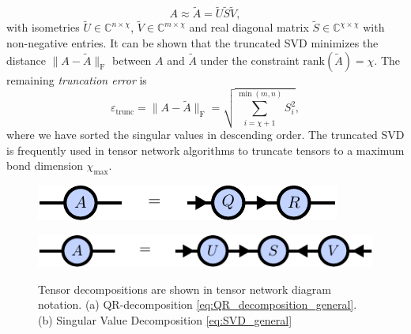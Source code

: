 \begin{equation}
	\label{eq:truncated_SVD_general}
	A \approx \tilde{A} = \tilde{U}\tilde{S}\tilde{V},
\end{equation}
with isometries $\tilde{U}\in\mathbb{C}^{n\times\chi}$, $\tilde{V}\in\mathbb{C}^{m\times\chi}$ and real diagonal matrix $\tilde{S}\in\mathbb{C}^{\chi\times\chi}$ with non-negative entries. It can be shown \cite{cite:eckart_young_theorem} that the truncated SVD minimizes the distance $\lVert A - \tilde{A} \rVert_\text{F}$ between $A$ and $\tilde{A}$ under the constraint $\text{rank}(\tilde{A}) = \chi$. The remaining \textit{truncation error} is
\begin{equation}
	\varepsilon_\text{trunc} = \lVert A - \tilde{A} \rVert_\text{F} = \sqrt{\sum_{i=\chi+1}^{\min(m,n)} S_i^2},
\end{equation} 
where we have sorted the singular values in descending order. The truncated SVD is frequently used in tensor network algorithms to truncate tensors to a maximum bond dimension $\chi_\text{max}$. \par
\begin{figure}
	\centering
	\begin{subfigure}[c]{0.1\textwidth}
		\caption{}\label{fig:tensor_decomposition_qr}
	\end{subfigure}%
	\begin{minipage}[c]{0.6\textwidth}
		\raisebox{-26pt}
		{%
			\includegraphics[scale=1]{figures/tikz/Tensor_Networks/tensor_decompositions/tensor_decompositions_a.pdf}
		}
	\end{minipage}
	\par\medskip
	\begin{subfigure}[c]{0.1\textwidth}
		\caption{}\label{fig:tensor_decomposition_svd}
	\end{subfigure}%
	\begin{minipage}[c]{0.6\textwidth}
		\raisebox{-26pt}
		{%
			\includegraphics[scale=1]{figures/tikz/Tensor_Networks/tensor_decompositions/tensor_decompositions_b.pdf}
		}
	\end{minipage}
	\caption{Tensor decompositions are shown in tensor network diagram notation. (a) QR-decomposition \eqref{eq:QR_decomposition_general}. (b) Singular Value Decomposition \eqref{eq:SVD_general}}
	\label{fig:tensor_decomposition_diagrams}
\end{figure}